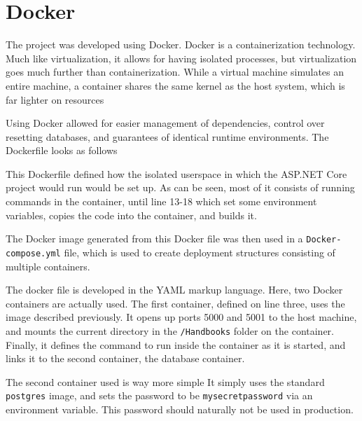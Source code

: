 \section{Docker}
The project was developed using Docker.
Docker is a containerization technology.
Much like virtualization, it allows for having isolated processes, but virtualization goes much further than containerization.
While a virtual machine simulates an entire machine, a container shares the same kernel as the host system, which is far lighter on resources


Using Docker allowed for easier management of dependencies, control over resetting databases, and guarantees of identical runtime environments.
The Dockerfile looks as follows

This Dockerfile defined how the isolated userspace in which the ASP.NET Core project would run would be set up.
As can be seen, most of it consists of running commands in the container, until line 13-18 which set some environment variables, copies the code into the container, and builds it.

The Docker image generated from this Docker file was then used in a \texttt{Docker-compose.yml} file, which is used to create deployment structures consisting of multiple containers.

The docker file is developed in the YAML markup language.
Here, two Docker containers are actually used.
The first container, defined on line three, uses the image described previously.
It opens up ports 5000 and 5001 to the host machine, and mounts the current directory in the \texttt{/Handbooks} folder on the container.
Finally, it defines the command to run inside the container as it is started, and links it to the second container, the database container.

The second container used is way more simple
It simply uses the standard \texttt{postgres} image, and sets the password to be \texttt{mysecretpassword} via an environment variable.
This password should naturally not be used in production.
